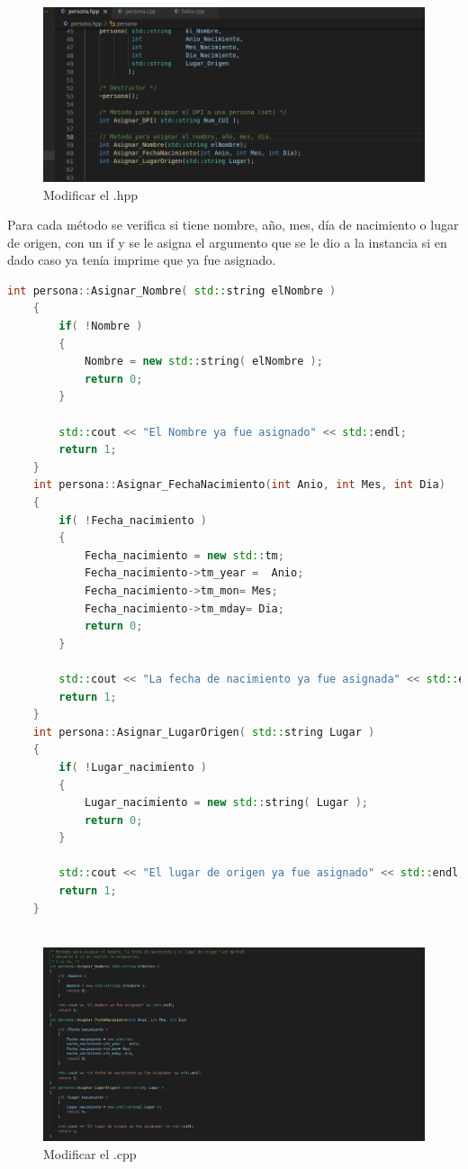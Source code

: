 \documentclass[11pt]{article}
\begin{document}
	\begin{figure}[H]
		\centering
		\includegraphics[width=0.7\linewidth]{img}
		\caption{Modificar el .hpp}
		\label{fig:img}
	\end{figure}

Para cada método se verifica si tiene nombre, año, mes, día de nacimiento o lugar de origen, con un if y se le asigna el argumento que se le dio a la instancia si en dado caso ya tenía imprime que ya fue asignado.


\begin{lstlisting}[language=c++]
	int persona::Asignar_Nombre( std::string elNombre )
	{
		if( !Nombre )
		{
			Nombre = new std::string( elNombre );
			return 0;
		}
		
		std::cout << "El Nombre ya fue asignado" << std::endl;
		return 1;
	}
	int persona::Asignar_FechaNacimiento(int Anio, int Mes, int Dia)
	{
		if( !Fecha_nacimiento )
		{   
			Fecha_nacimiento = new std::tm;
			Fecha_nacimiento->tm_year =  Anio;
			Fecha_nacimiento->tm_mon= Mes;
			Fecha_nacimiento->tm_mday= Dia;
			return 0;
		}
		
		std::cout << "La fecha de nacimiento ya fue asignada" << std::endl;
		return 1;
	}
	int persona::Asignar_LugarOrigen( std::string Lugar )
	{
		if( !Lugar_nacimiento )
		{
			Lugar_nacimiento = new std::string( Lugar );
			return 0;
		}
		
		std::cout << "El lugar de origen ya fue asignado" << std::endl;
		return 1;
	}
	
\end{lstlisting}



		\begin{figure}[H]
		\centering
		\includegraphics[width=0.7\linewidth]{img1}
		\caption{Modificar el .cpp}
		\label{fig:img1}
	\end{figure}
	
\end{document}

